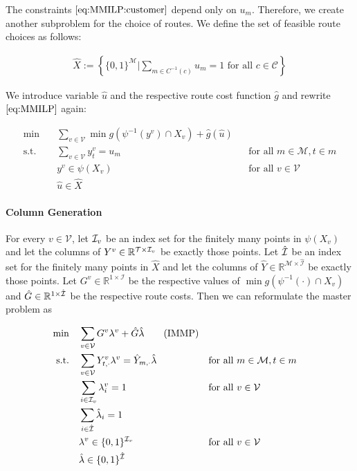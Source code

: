 The constraints $\eqref{eq:MMILP:customer}$ depend only on $u_m$. Therefore, we create another subproblem for the choice of routes. We define the set of feasible route choices as follows:

\begin{align*}
	\hat{X} := \left\{\{0,1\}^{\mathcal{M}}|\sum_{m\in C^{-1}(c)} u_m = 1 \text{ for all } c\in\mathcal{C}\right\}
\end{align*}

We introduce variable $\hat{u}$ and the respective route cost function $\hat{g}$ and rewrite $\eqref{eq:MMILP}$ again:

\begin{align*}
	\min \quad & \sum_{v\in\mathcal{V}} \min g\left(\psi^{-1}\left(y^v\right)\cap X_v\right) + \hat{g}\left(\hat{u}\right) \\
	\text{s.t.} \quad & \sum_{v\in\mathcal{V}}y_t^v = u_m && \text{for all } m\in\mathcal{M},t\in m \\
	& y^v\in \psi\left(X_v\right) && \text{for all } v\in\mathcal{V} \\
	& \hat{u}\in\hat{X}
\end{align*}

\paragraph{Column Generation} \parfill

For every $v\in\mathcal{V}$, let $\mathcal{I}_v$ be an index set for the finitely many points in $\psi\left(X_v\right)$ and let the columns of $Y^v\in\mathbb{R}^{\mathcal{T}\times\mathcal{I}_v}$ be exactly those points. Let $\hat{\mathcal{I}}$ be an index set for the finitely many points in $\hat{X}$ and let the columns of $\hat{Y}\in\mathbb{R}^{\mathcal{M}\times\hat{\mathcal{I}}}$ be exactly those points. Let $G^v\in\mathbb{R}^{1\times\mathcal{I}}$ be the respective values of $\min g\left(\psi^{-1}(\cdot)\cap X_v\right)$ and $\hat{G}\in\mathbb{R}^{1\times\hat{\mathcal{I}}}$ be the respective route costs. Then we can reformulate the master problem as

\begin{align*}
	\min \quad & \sum_{v\in\mathcal{V}}G^v\lambda^v + \hat{G}\hat{\lambda} \tag{IMMP} \\
	\text{s.t.} \quad & \sum_{v\in\mathcal{V}} Y^v_{t,\cdot}\lambda^v = \hat{Y}_{m,\cdot}\hat{\lambda} && \text{for all } m\in\mathcal{M},t\in m \\
	& \sum_{i\in\mathcal{I}_v}\lambda_i^v=1 && \text{for all } v\in\mathcal{V}\\
	& \sum_{i\in\hat{\mathcal{I}}}\hat{\lambda}_i= 1 \\
	& \lambda^v\in\{0,1\}^{\mathcal{I}_v} && \text{for all } v\in\mathcal{V} \\
	& \hat{\lambda}\in\{0,1\}^{\hat{\mathcal{I}}}
\end{align*}

